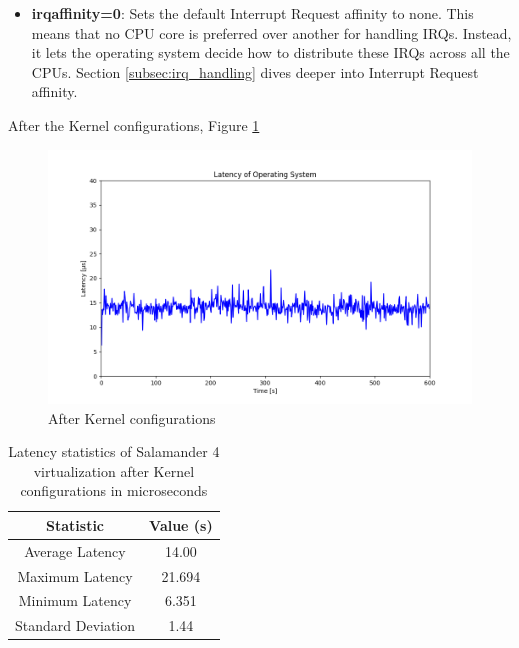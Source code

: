 \documentclass[MMR,Master,english]{twbook}
\begin{document}
\begin{itemize}
	\item \textbf{irqaffinity=0}: Sets the default Interrupt Request affinity to none. This means that no CPU core is preferred over another for handling IRQs. Instead, it lets the operating system decide how to distribute these IRQs across all the CPUs. Section \ref{subsec:irq_handling} dives deeper into Interrupt Request affinity.
\end{itemize}

After the Kernel configurations, Figure \ref{fig:max_latency_rt_kernelparam}

\begin{figure}[H]
	\centering
	\includegraphics[width=1.0\columnwidth]{masterthesis-documentation/docs/sigmatek/xenomai/4rt_kernelparam/max_latency_rt_kernelparam/max_latency_rt_kernelparam.png}
	\caption[After Kernel configurations]{After Kernel configurations}
	\label{fig:max_latency_rt_kernelparam}
\end{figure}

\begin{table}[H]
	\centering
	\caption[Latency statistics of Salamander 4 after Kernel configurations]{Latency statistics of Salamander 4 virtualization after Kernel configurations in microseconds}
	\label{tab:latency_statistics_virt}
	\setlength{\tabcolsep}{0.5em} %
	{\renewcommand{\arraystretch}{1.2}%
	\begin{tabular}{|c|c|}\hline
	\textbf{Statistic} & \textbf{Value (\textmu s)} \\\hline
	Average Latency & 14.00 \\\hline
	Maximum Latency & 21.694 \\\hline
	Minimum Latency & 6.351 \\\hline
	Standard Deviation & 1.44 \\\hline
	\end{tabular}}
	\end{table}
\end{document}
